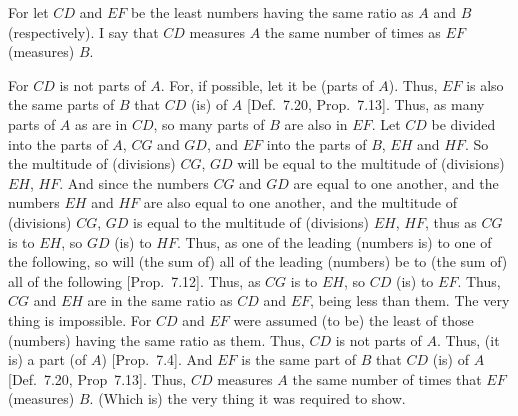 \begin{Parallel}{}{}
{For let $CD$ and $EF$ be the least numbers having the same ratio as $A$ and
$B$ (respectively). I say that $CD$ measures $A$ the same number of times
as $EF$ (measures) $B$.

\epsfysize=2in
\centerline{}

For $CD$ is not parts of $A$. For, if possible, let it be (parts of $A$). Thus,
$EF$ is also the same parts of $B$ that $CD$ (is) of $A$  [Def.~7.20, Prop.~7.13]. Thus, as many parts of $A$ as
are in $CD$, so many parts of $B$ are also in $EF$.  Let $CD$ be divided into the parts of $A$, $CG$ and $GD$, and $EF$ into the
parts of $B$, $EH$ and $HF$. So the multitude of (divisions) $CG$, $GD$
will be equal to the multitude of (divisions) $EH$, $HF$. And since the
numbers $CG$ and $GD$ are equal to one another, and the numbers
$EH$ and $HF$ are also equal to one another, and the multitude of (divisions)
$CG$, $GD$ is equal to the multitude of (divisions) $EH$, $HF$, thus as $CG$ is to $EH$, so
$GD$ (is) to $HF$. Thus,  as one of the
leading (numbers is) to one of the following, so will (the sum of) all
of the leading (numbers)  be  to (the sum of) all of the following [Prop.~7.12].  Thus, as $CG$ is to $EH$,
so $CD$ (is) to $EF$. Thus, $CG$ and $EH$ are in the same ratio as
$CD$ and $EF$, being less than them. The very thing is impossible. For
$CD$ and $EF$ were assumed (to be) the least of those (numbers) having
the same ratio as them. Thus, $CD$ is not parts of $A$. Thus, (it is) a
part (of $A$) [Prop.~7.4]. And $EF$ is the same part of $B$ that $CD$ (is) of $A$ [Def.~7.20, Prop~7.13]. Thus, $CD$ measures $A$ the same number of times that $EF$ (measures) $B$. (Which is) the very thing it was required to
show.}
\end{Parallel}

